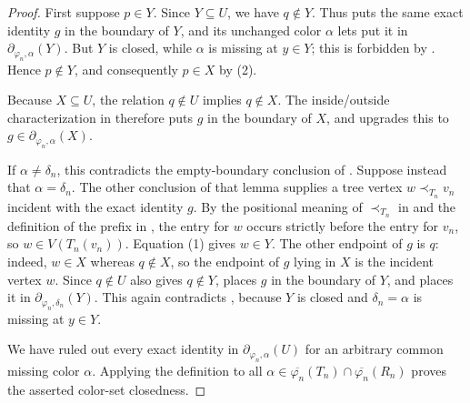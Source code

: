 \begin{proof}
First suppose $p\in Y$.  Since $Y\subseteq U$, we have $q\notin Y$.
Thus  puts the same exact identity $g$ in the
boundary of $Y$, and its unchanged color $\alpha$ lets
 put it in
$\partial_{\varphi_n,\alpha}(Y)$.  But $Y$ is closed, while $\alpha$
is missing at $y\in Y$; this is forbidden by
.  Hence $p\notin Y$, and consequently
$p\in X$ by (2).

Because $X\subseteq U$, the relation $q\notin U$ implies $q\notin X$.
The inside/outside characterization in  therefore
puts $g$ in the boundary of $X$, and 
upgrades this to $g\in\partial_{\varphi_n,\alpha}(X)$.

If $\alpha\ne\delta_n$, this contradicts the empty-boundary conclusion
of .  Suppose instead that
$\alpha=\delta_n$.  The other conclusion of that lemma supplies a tree
vertex $w\prec_{T_n}v_n$ incident with the exact identity $g$.
By the positional meaning of $\prec_{T_n}$ in
 and the definition of the prefix in
, the entry for $w$ occurs strictly before
the entry for $v_n$, so $w\in V(T_n(v_n))$.  Equation (1) gives
$w\in Y$.  The other endpoint of $g$ is $q$: indeed, $w\in X$ whereas
$q\notin X$, so the endpoint of $g$ lying in $X$ is the incident vertex
$w$.  Since $q\notin U$ also gives $q\notin Y$,
 places $g$ in the boundary of $Y$, and
 places it in
$\partial_{\varphi_n,\delta_n}(Y)$.  This again contradicts
, because $Y$ is closed and
$\delta_n=\alpha$ is missing at $y\in Y$.

We have ruled out every exact identity in
$\partial_{\varphi_n,\alpha}(U)$ for an arbitrary common missing color
$\alpha$.  Applying the definition  to all
$\alpha\in\overline{\varphi_n}(T_n)\cap
\overline{\varphi_n}(R_n)$ proves the asserted color-set closedness.
\end{proof}
